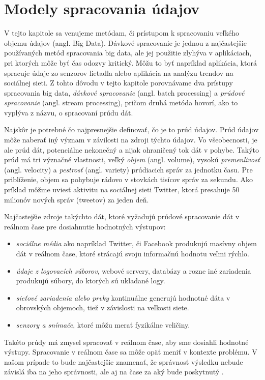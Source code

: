 \chapter{Modely spracovania údajov}
\label{Data streams overview and processing methods}
V tejto kapitole sa venujeme metódam, či prístupom k spracovaniu veľkého objemu údajov (angl. Big Data). Dávkové spracovanie je jednou z najčastejšie používaných metód spracovania big data, ale jej použitie zlyhýva v aplikáciach, pri ktorých môže byť čas odozvy kritický. Môžu to byť napríklad aplikácia, ktorá spracuje údaje zo senzorov lietadla alebo aplikácia na analýzu trendov na sociálnej sieti. Z tohto dôvodu v tejto kapitole porovnávame dva prístupy spracovania big data, \textit{dávkové spracovanie} (angl. batch processing) a \textit{prúdové spracovanie} (angl. stream processing), pričom druhá metóda hovorí, ako to vyplýva z názvu, o spracovaní prúdu dát.
\par
Najskôr je potrebné čo najpresnejšie definovať, čo je to prúd údajov. Prúd údajov môže naberať iný význam v závilosti na zdroji týchto údajov. Vo všeobecnosti, je ale prúd dát, potenciálne nekonečný a nijak ohraničený tok dát v pohybe. Takýto prúd má tri význačné vlastnosti, veľký \textit{objem} (angl. volume), vysokú \textit{premenlivosť} (angl. velocity) a \textit{pestrosť} (angl. variety) prúdiacich správ za jednotku času\citep{kaisler2013big}. Pre priblíženie, objem sa pohybuje rádovo v stovkách tisícov správ za sekundu. Ako príklad môžme uviesť aktivitu na sociálnej sieti Twitter, ktorá presahuje 50 milionóv nových správ (tweetov) za jeden deň\citep{mathioudakis2010twittermonitor}.
\par
Najčastejšie zdroje takýchto dát, ktoré vyžadujú prúdové spracovanie dát v reálnom čase pre dosiahnutie hodnotných výstupov:
\begin{itemize}
    \item \textit{sociálne média} ako napríklad Twitter, či Facebook produkujú masívny objem dát v reálnom čase, ktoré strácajú svoju informačnú hodnotu veľmi rýchlo.
    \item \textit{údaje z logovacích súborov}, webové servery, databázy a rozne iné zariadenia produkujú súbory, do ktorých sú ukladané logy.
    \item \textit{sieťové zariadenia alebo prvky} kontinuálne generujú hodnotné dáta v obrovských objemoch, tiež v závislosti na veľkosti siete.
    \item \textit{senzory a snímače}, ktoré môžu merať fyzikálne veličiny.
\end{itemize} 
Takéto prúdy má zmysel spracovať v reálnom čase, aby sme dosiahli hodnotné výstupy. Spracovanie v reálnom čase sa môže opäť meniť v kontexte problému. V našom prípade to bude najčastejšie znamenať, že správnosť výsledku nebude závislá iba na jeho správnosti, ale aj na čase za aký bude poskytnutý \citep{stankovic1999misconceptions}. \\

